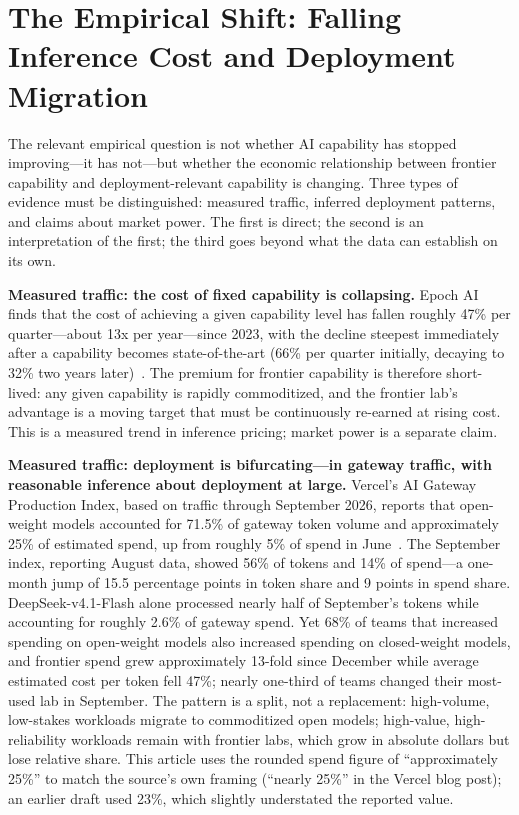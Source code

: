 \section{The Empirical Shift: Falling Inference Cost and Deployment Migration}

The relevant empirical question is not whether AI capability has stopped improving---it has not---but whether the economic relationship between frontier capability and deployment-relevant capability is changing. Three types of evidence must be distinguished: measured traffic, inferred deployment patterns, and claims about market power. The first is direct; the second is an interpretation of the first; the third goes beyond what the data can establish on its own.

\textbf{Measured traffic: the cost of fixed capability is collapsing.} Epoch AI finds that the cost of achieving a given capability level has fallen roughly 47\% per quarter---about 13x per year---since 2023, with the decline steepest immediately after a capability becomes state-of-the-art (66\% per quarter initially, decaying to 32\% two years later)~\cite{epochai2026}. The premium for frontier capability is therefore short-lived: any given capability is rapidly commoditized, and the frontier lab's advantage is a moving target that must be continuously re-earned at rising cost. This is a measured trend in inference pricing; market power is a separate claim.

\textbf{Measured traffic: deployment is bifurcating---in gateway traffic, with reasonable inference about deployment at large.} Vercel's AI Gateway Production Index, based on traffic through September 2026, reports that open-weight models accounted for 71.5\% of gateway token volume and approximately 25\% of estimated spend, up from roughly 5\% of spend in June~\cite{vercel2026}. The September index, reporting August data, showed 56\% of tokens and 14\% of spend---a one-month jump of 15.5 percentage points in token share and 9 points in spend share. DeepSeek-v4.1-Flash alone processed nearly half of September's tokens while accounting for roughly 2.6\% of gateway spend. Yet 68\% of teams that increased spending on open-weight models also increased spending on closed-weight models, and frontier spend grew approximately 13-fold since December while average estimated cost per token fell 47\%; nearly one-third of teams changed their most-used lab in September. The pattern is a split, not a replacement: high-volume, low-stakes workloads migrate to commoditized open models; high-value, high-reliability workloads remain with frontier labs, which grow in absolute dollars but lose relative share. This article uses the rounded spend figure of ``approximately 25\%'' to match the source's own framing (``nearly 25\%'' in the Vercel blog post); an earlier draft used 23\%, which slightly understated the reported value.

